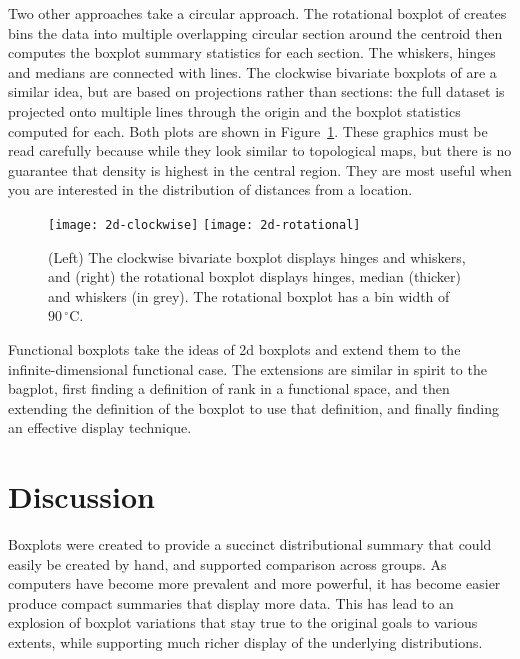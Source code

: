 \documentclass[oneside]{article}
\begin{document}
Two other approaches take a circular approach. The rotational boxplot of \citet{muth:2000} creates bins the data into multiple overlapping circular section around the centroid then computes the boxplot summary statistics for each section. The whiskers, hinges and medians are connected with lines. The clockwise bivariate boxplots of \citet{corbellini:2002} are a similar idea, but are based on projections rather than sections: the full dataset is projected onto multiple lines through the origin and the boxplot statistics computed for each. Both plots are shown in Figure~\ref{fig:2d-circular}. These graphics must be read carefully because while they look similar to topological maps, but there is no guarantee that density is highest in the central region. They are most useful when you are interested in the distribution of distances from a location.

\begin{figure}[htbp]
  \centering
  \texttt{[image: 2d-clockwise]}%
  \texttt{[image: 2d-rotational]}%

  \caption{(Left) The clockwise bivariate boxplot displays hinges and whiskers, and (right) the rotational boxplot displays hinges, median (thicker) and whiskers (in grey). The rotational boxplot has a bin width of $90\,^{\circ}\mathrm{C}$. }

  \label{fig:2d-circular}
\end{figure}

Functional boxplots \citep{hyndman:2010,sun:2011} take the ideas of 2d boxplots and extend them to the infinite-dimensional functional case. The extensions are similar in spirit to the bagplot, first finding a definition of rank in a functional space, and then extending the definition of the boxplot to use that definition, and finally finding an effective display technique.

\section{Discussion}
\label{sec:discussion}

Boxplots were created to provide a succinct distributional summary that could easily be created by hand, and supported comparison across groups. As computers have become more prevalent and more powerful, it has become easier produce compact summaries that display more data. This has lead to an explosion of boxplot variations that stay true to the original goals to various extents, while supporting much richer display of the underlying distributions.
\end{document}
